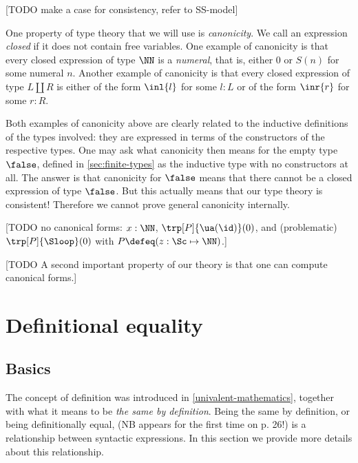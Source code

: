 [TODO make a case for consistency, refer to SS-model]

One property of type theory that we will use is \emph{canonicity}.
We call an expression \emph{closed} if it does not contain free variables.
One example of canonicity is that every closed expression of type $\NN$
is a \emph{numeral}, that is, either $0$ or $S(n)$ for some numeral $n$.
Another example of canonicity is that every closed expression of 
type $L\coprod R$ is either of the form $\inl{l}$ for some $l:L$ or
of the form $\inr{r}$ for some $r:R$.

Both examples of canonicity above are clearly related to the
inductive definitions of the types involved: they are
expressed in terms of the constructors of the respective types.
One may ask what canonicity then means for the empty type $\false$,
defined in \cref{sec:finite-types} as the inductive type
with no constructors at all. The answer is that canonicity for $\false$
means that there cannot be a closed expression of type $\false$.
But this actually means that our type theory is consistent!
Therefore we cannot prove general canonicity internally.

[TODO no canonical forms: $x:\NN$, $\trp[P]{\ua(\id)}(0)$, and (problematic) $\trp[P]{\Sloop}(0)$
with $P\defeq (z:\Sc \mapsto \NN)$.]

[TODO A second important property of our theory is 
that one can compute canonical forms.]

\section{Definitional equality}
\label{sec:defeq}

\subsection{Basics}
\label{sec:defeq-basics}

The concept of definition was introduced in \cref{univalent-mathematics},
together with what it means to be \emph{the same by definition}. 
Being the same by definition, or being definitionally equal, 
(NB appears for the first time on p. 26!) 
is a relationship between syntactic expressions.
In this section we provide more details about this relationship.

